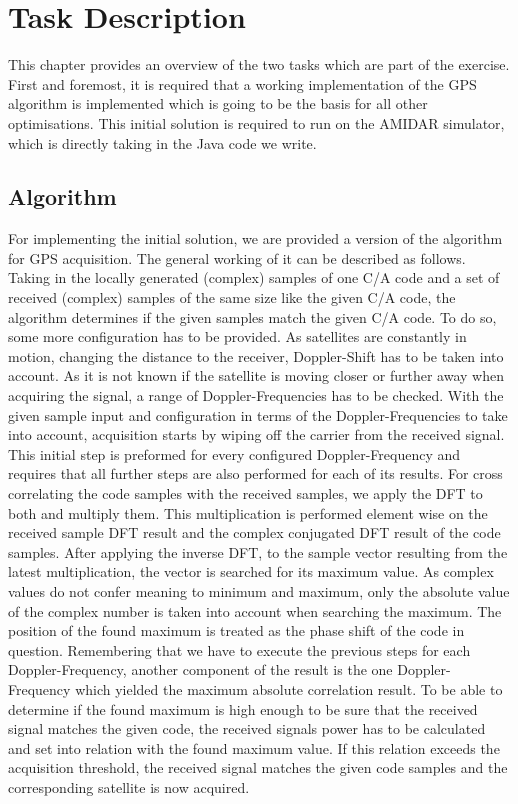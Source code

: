 \chapter{Task Description}
\label{cha:task}
	This chapter provides an overview of the two tasks which are part of the exercise.
	First and foremost, it is required that a working implementation of the GPS algorithm is implemented which is going to be the basis for all other optimisations. This initial solution is required to run on the AMIDAR simulator, which is directly taking in the Java code we write.

	\section{Algorithm} %
	\label{sec:task_algorithm}
		For implementing the initial solution, we are provided a version of the algorithm for GPS acquisition. The general working of it can be described as follows.
		Taking in the locally generated (complex) samples of one C/A code and a set of received (complex) samples of the same size like the given C/A code, the algorithm determines if the given samples match the given C/A code. 
		To do so, some more configuration has to be provided. As satellites are constantly in motion, changing the distance to the receiver, Doppler-Shift has to be taken into account. As it is not known if the satellite is moving closer or further away when acquiring the signal, a range of Doppler-Frequencies has to be checked. With the given sample input and configuration in terms of the Doppler-Frequencies to take into account, acquisition starts by wiping off the carrier from the received signal. This initial step is preformed for every configured Doppler-Frequency and requires that all further steps are also performed for each of its results. 
		For cross correlating the code samples with the received samples, we apply the DFT to both and multiply them. This multiplication is performed element wise on the received sample DFT result and the complex conjugated DFT result of the code samples.
		After applying the inverse DFT, to the sample vector resulting from the latest multiplication, the vector is searched for its maximum value. As complex values do not confer meaning to minimum and maximum, only the absolute value of the complex number is taken into account when searching the maximum. The position of the found maximum is treated as the phase shift of the code in question. 
		Remembering that we have to execute the previous steps for each Doppler-Frequency, another component of the result is the one Doppler-Frequency which yielded the maximum absolute correlation result. 
		To be able to determine if the found maximum is high enough to be sure that the received signal matches the given code, the received signals power has to be calculated and set into relation with the found maximum value. If this relation exceeds the acquisition threshold, the received signal matches the given code samples and the corresponding satellite is now acquired.

